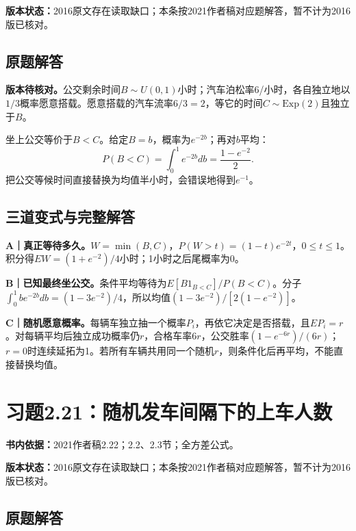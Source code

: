 \documentclass[
  11pt,
  a4paper,
  UTF8,fontset=fandol]{ctexart}
\let\OldSection\section
\renewcommand{\section}{\Needspace{7\baselineskip}\OldSection}
\let\OldSubsection\subsection
\renewcommand{\subsection}{\Needspace{5\baselineskip}\OldSubsection}
\begin{document}
\textbf{版本状态：}2016原文存在读取缺口；本条按2021作者稿对应题解答，暂不计为2016版已核对。

\subsection{原题解答}\label{ux539fux9898ux89e3ux7b54-19}

\textbf{版本待核对。}公交剩余时间\(B\sim U(0,1)\)小时；汽车泊松率6/小时，各自独立地以\(1/3\)概率愿意搭载。愿意搭载的汽车流率\(6/3=2\)，等它的时间\(C\sim\mathrm{Exp}(2)\)且独立于\(B\)。

坐上公交等价于\(B<C\)。给定\(B=b\)，概率为\(e^{-2b}\)；再对\(b\)平均：
\[\boxed{P(B<C)=\int_0^1e^{-2b}db=\frac{1-e^{-2}}2.}\]
把公交等候时间直接替换为均值半小时，会错误地得到\(e^{-1}\)。

\subsection{三道变式与完整解答}\label{ux4e09ux9053ux53d8ux5f0fux4e0eux5b8cux6574ux89e3ux7b54-19}

\textbf{A｜真正等待多久。}\(W=\min(B,C)\)，\(P(W>t)=(1-t)e^{-2t}\)，\(0\le t\le1\)。积分得\(EW=(1+e^{-2})/4\)小时；1小时之后尾概率为0。

\textbf{B｜已知最终坐公交。}条件平均等待为\(E[B1_{B<C}]/P(B<C)\)。分子\(\int_0^1b e^{-2b}db=(1-3e^{-2})/4\)，所以均值\((1-3e^{-2})/[2(1-e^{-2})]\)。

\textbf{C｜随机愿意概率。}每辆车独立抽一个概率\(P_i\)，再依它决定是否搭载，且\(EP_i=r\)。对每辆平均后独立成功概率仍\(r\)，合格车率\(6r\)，公交胜率\((1-e^{-6r})/(6r)\)；\(r=0\)时连续延拓为1。若所有车辆共用同一个随机\(r\)，则条件化后再平均，不能直接替换均值。

\newpage

\section{习题2.21：随机发车间隔下的上车人数}\label{ux4e60ux98982.21ux968fux673aux53d1ux8f66ux95f4ux9694ux4e0bux7684ux4e0aux8f66ux4ebaux6570}

\textbf{书内依据：}2021作者稿2.22；2.2、2.3节；全方差公式。

\textbf{版本状态：}2016原文存在读取缺口；本条按2021作者稿对应题解答，暂不计为2016版已核对。

\subsection{原题解答}\label{ux539fux9898ux89e3ux7b54-20}
\end{document}
